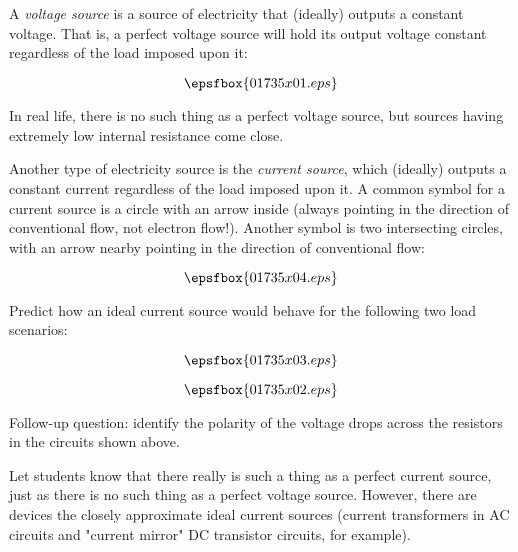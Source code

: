 

A {\it voltage source} is a source of electricity that (ideally) outputs a constant voltage.  That is, a perfect voltage source will hold its output voltage constant regardless of the load imposed upon it:

$$\epsfbox{01735x01.eps}$$

In real life, there is no such thing as a perfect voltage source, but sources having extremely low internal resistance come close.

\vskip 10pt

Another type of electricity source is the {\it current source}, which (ideally) outputs a constant current regardless of the load imposed upon it.  A common symbol for a current source is a circle with an arrow inside (always pointing in the direction of conventional flow, not electron flow!).  Another symbol is two intersecting circles, with an arrow nearby pointing in the direction of conventional flow:

$$\epsfbox{01735x04.eps}$$

Predict how an ideal current source would behave for the following two load scenarios:

$$\epsfbox{01735x03.eps}$$







$$\epsfbox{01735x02.eps}$$

\vskip 10pt

Follow-up question: identify the polarity of the voltage drops across the resistors in the circuits shown above.







Let students know that there really is such a thing as a perfect current source, just as there is no such thing as a perfect voltage source.  However, there are devices the closely approximate ideal current sources (current transformers in AC circuits and "current mirror" DC transistor circuits, for example).





